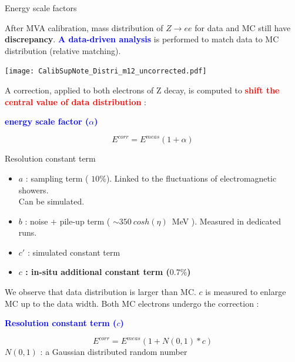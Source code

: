 \begin{frame}{Energy scale factors}
  \begin{minipage}{0.49\linewidth}
    After MVA calibration, mass distribution of $Z\rightarrow ee$ for data and MC still have {\bf discrepancy}.
    \newline
    \textcolor{blue}{\bf A data-driven analysis } is performed to match data to MC distribution (relative matching).
  \end{minipage}
  \hfill
  \begin{minipage}{0.49\linewidth}
    \texttt{[image: CalibSupNote\_Distri\_m12\_uncorrected.pdf]}
  \end{minipage}

A correction, applied to both electrons of Z decay, is computed to \textcolor{red}{\bf shift the central value of data distribution} : 
\begin{center} \textcolor{blue}{\bf energy scale factor ($\alpha$)} \end{center}
$$E^{corr}=E^{meas}(1+\alpha)$$
\end{frame}

\begin{frame}{Resolution constant term}
  
  \begin{itemize}
  \item $a$ : sampling term ( $10\%$). Linked to the fluctuations of electromagnetic showers. \\Can be simulated.
  \item $b$ : noise + pile-up term ( $\sim 350~cosh(\eta )$~MeV ). Measured in dedicated runs.
  \item $c'$ : simulated constant term
  \item {\bf $c$ : in-situ additional constant term ($0.7\%$)}
  \end{itemize}
  We observe that data distribution is larger than MC. 
  $c$ is measured to enlarge MC up to the data width.
  Both MC electrons undergo the correction :
  \begin{center}\textcolor{blue}{\bf Resolution constant term ($c$) }\end{center}
  $$E^{corr} = E^{meas}(1+N(0,1)*c)$$
  $N(0,1)$ : a Gaussian distributed random number
\end{frame}

